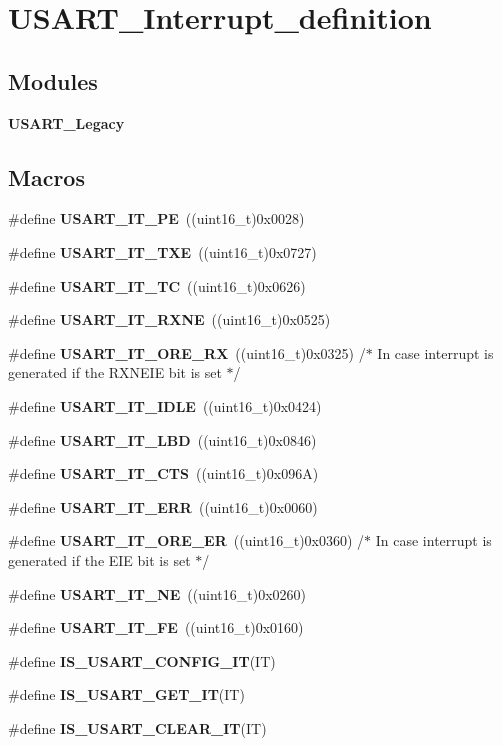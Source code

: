 \section{U\+S\+A\+R\+T\+\_\+\+Interrupt\+\_\+definition}
\label{group__USART__Interrupt__definition}
\subsection*{Modules}
\begin{DoxyCompactItemize}
\item 
\textbf{ U\+S\+A\+R\+T\+\_\+\+Legacy}
\end{DoxyCompactItemize}
\subsection*{Macros}
\begin{DoxyCompactItemize}
\item 
\#define \textbf{ U\+S\+A\+R\+T\+\_\+\+I\+T\+\_\+\+PE}~((uint16\+\_\+t)0x0028)
\item 
\#define \textbf{ U\+S\+A\+R\+T\+\_\+\+I\+T\+\_\+\+T\+XE}~((uint16\+\_\+t)0x0727)
\item 
\#define \textbf{ U\+S\+A\+R\+T\+\_\+\+I\+T\+\_\+\+TC}~((uint16\+\_\+t)0x0626)
\item 
\#define \textbf{ U\+S\+A\+R\+T\+\_\+\+I\+T\+\_\+\+R\+X\+NE}~((uint16\+\_\+t)0x0525)
\item 
\#define \textbf{ U\+S\+A\+R\+T\+\_\+\+I\+T\+\_\+\+O\+R\+E\+\_\+\+RX}~((uint16\+\_\+t)0x0325) /$\ast$ In case interrupt is generated if the R\+X\+N\+E\+I\+E bit is set $\ast$/
\item 
\#define \textbf{ U\+S\+A\+R\+T\+\_\+\+I\+T\+\_\+\+I\+D\+LE}~((uint16\+\_\+t)0x0424)
\item 
\#define \textbf{ U\+S\+A\+R\+T\+\_\+\+I\+T\+\_\+\+L\+BD}~((uint16\+\_\+t)0x0846)
\item 
\#define \textbf{ U\+S\+A\+R\+T\+\_\+\+I\+T\+\_\+\+C\+TS}~((uint16\+\_\+t)0x096\+A)
\item 
\#define \textbf{ U\+S\+A\+R\+T\+\_\+\+I\+T\+\_\+\+E\+RR}~((uint16\+\_\+t)0x0060)
\item 
\#define \textbf{ U\+S\+A\+R\+T\+\_\+\+I\+T\+\_\+\+O\+R\+E\+\_\+\+ER}~((uint16\+\_\+t)0x0360) /$\ast$ In case interrupt is generated if the E\+I\+E bit is set $\ast$/
\item 
\#define \textbf{ U\+S\+A\+R\+T\+\_\+\+I\+T\+\_\+\+NE}~((uint16\+\_\+t)0x0260)
\item 
\#define \textbf{ U\+S\+A\+R\+T\+\_\+\+I\+T\+\_\+\+FE}~((uint16\+\_\+t)0x0160)
\item 
\#define \textbf{ I\+S\+\_\+\+U\+S\+A\+R\+T\+\_\+\+C\+O\+N\+F\+I\+G\+\_\+\+IT}(IT)
\item 
\#define \textbf{ I\+S\+\_\+\+U\+S\+A\+R\+T\+\_\+\+G\+E\+T\+\_\+\+IT}(IT)
\item 
\#define \textbf{ I\+S\+\_\+\+U\+S\+A\+R\+T\+\_\+\+C\+L\+E\+A\+R\+\_\+\+IT}(IT)
\end{DoxyCompactItemize}


